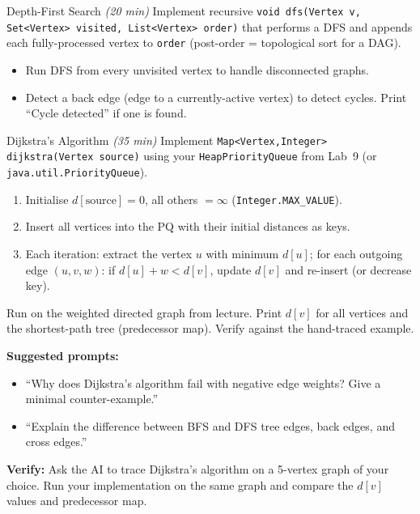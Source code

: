 \documentclass[11pt]{article}
\begin{document}
\begin{labexercise}{Depth-First Search \hfill {\small \itshape (20 min)}}
Implement recursive \texttt{void dfs(Vertex v, Set<Vertex> visited, List<Vertex> order)}
that performs a DFS and appends each fully-processed vertex to \texttt{order}
(post-order = topological sort for a DAG).
\begin{itemize}[leftmargin=*,nosep]
  \item Run DFS from every unvisited vertex to handle disconnected graphs.
  \item Detect a back edge (edge to a currently-active vertex) to detect cycles.
        Print ``Cycle detected'' if one is found.
\end{itemize}
\end{labexercise}

\begin{labexercise}{Dijkstra's Algorithm \hfill {\small \itshape (35 min)}}
Implement \texttt{Map<Vertex,Integer> dijkstra(Vertex source)} using your
\texttt{HeapPriorityQueue} from Lab~9 (or \texttt{java.util.PriorityQueue}).
\begin{enumerate}[leftmargin=*,nosep]
  \item Initialise $d[\text{source}] = 0$, all others $= \infty$ (\texttt{Integer.MAX\_VALUE}).
  \item Insert all vertices into the PQ with their initial distances as keys.
  \item Each iteration: extract the vertex $u$ with minimum $d[u]$; for each outgoing edge
        $(u,v,w)$: if $d[u] + w < d[v]$, update $d[v]$ and re-insert (or decrease key).
\end{enumerate}
Run on the weighted directed graph from lecture. Print $d[v]$ for all vertices and the
shortest-path tree (predecessor map). Verify against the hand-traced example.
\end{labexercise}

\begin{aicollab}
\textbf{Suggested prompts:}
\begin{itemize}[leftmargin=*,nosep]
  \item ``Why does Dijkstra's algorithm fail with negative edge weights?
        Give a minimal counter-example.''
  \item ``Explain the difference between BFS and DFS tree edges, back edges, and cross edges.''
\end{itemize}
\medskip\textbf{Verify:} Ask the AI to trace Dijkstra's algorithm on a 5-vertex graph of your choice.
Run your implementation on the same graph and compare the $d[v]$ values and predecessor map.
\end{aicollab}
\end{document}
